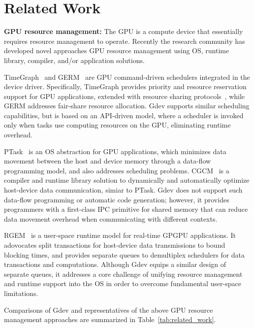 \section{Related Work}
\label{related_work}

\textbf{GPU resource management:}
The GPU is a compute device that essentially requires resource management
to operate.
Recently the research community has developed novel approaches GPU
resource management using OS, runtime library, compiler, and/or
application solutions.

TimeGraph~\cite{Kato_ATC11} and GERM~\cite{Bautin_MCNC08} are GPU
command-driven schedulers integrated in the device driver.
Specifically, TimeGraph provides priority and resource reservation
support for GPU applications, extended with resource sharing
protocols~\cite{Kato_RTAS11}, while GERM addresses fair-share
resource allocation. 
Gdev supports similar scheduling capabilities, but is based on an
API-driven model, where a scheduler is invoked only when tasks use
computing resources on the GPU, eliminating runtime overhead.

PTask~\cite{Rossbach_SOSP11} is an OS abstraction for GPU applications,
which minimizes data movement between the host and device memory through
a data-flow programming model, and also addresses scheduling problems.
CGCM~\cite{Jablin_PLDI11} is a compiler and runtime library solution to
dynamically and automatically optimize host-device data communication,
simiar to PTask.
Gdev does not support such data-flow programming or automatic code
generation; however, it provides programmers with a first-class IPC
primitive for shared memory that can reduce data movement overhead when
communicating with different contexts.

RGEM~\cite{Kato_RTSS11} is a user-space runtime model for real-time
GPGPU applications.
It adovocates split transactions for host-device data transmissions
to bound blocking times, and provides separate queues to demultiplex
schedulers for data transactions and computations.
Although Gdev equips a similar design of separate queues, it
addresses a core challenge of unifying resource management
and runtime support into the OS in order to overcome fundamental
user-space limitations.

Comparisons of Gdev and representatives of the above GPU resource
management approaches are summarized in Table~\ref{tab:related_work}.

\begin{table*}[t]
 \caption{Comparisons of Gdev and prior GPU resource management
 approaches.}
 \label{tab:related_work}
 \begin{center}
  {\sf
  \begin{tabular}{|l|p{12.8cm}|}
   \hline
   \hline
  \end{tabular}
  }
 \end{center}
\vspace{-1em}
\end{table*}


